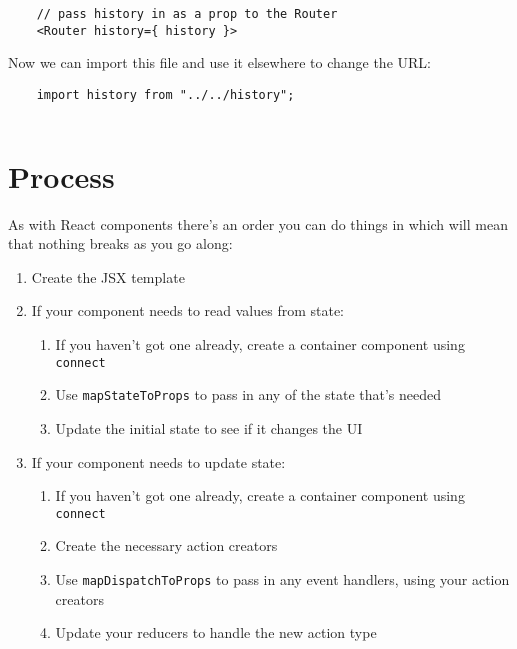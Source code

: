 \begin{verbatim}
    // pass history in as a prop to the Router
    <Router history={ history }>
\end{verbatim}

Now we can import this file and use it elsewhere to change the URL:


\begin{verbatim}
    import history from "../../history";
\end{verbatim}

\inputminted{js}{03/figures/12-mapDispatch.js}



\section{Process}

As with React components there's an order you can do things in which will mean that nothing breaks as you go along:

\begin{enumerate}
    \item Create the JSX template
    \item If your component needs to read values from state:
        \begin{enumerate}
            \item If you haven't got one already, create a container component using \texttt{connect}
            \item Use \texttt{mapStateToProps} to pass in any of the state that's needed
            \item Update the initial state to see if it changes the UI
        \end{enumerate}
    \item If your component needs to update state:
        \begin{enumerate}
            \item If you haven't got one already, create a container component using \texttt{connect}
            \item Create the necessary action creators
            \item Use \texttt{mapDispatchToProps} to pass in any event handlers, using your action creators
            \item Update your reducers to handle the new action type
        \end{enumerate}
\end{enumerate}

